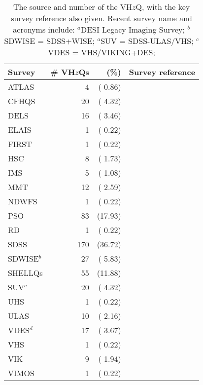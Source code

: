 \documentclass[usenatbib]{mnras}
\begin{document}
\begin{table}
\begin{tabular}{l r r l}
\hline  \hline
Survey              & \# VH$z$Qs & (\%) & Survey reference  \\
\hline  
  ATLAS             &     4    &   ( 0.86)    &  \citet{Shanks2015} \\
  CFHQS            &   20    &   ( 4.32)    &  \citet{Willott2007} \\
  DELS               &   16    &   ( 3.46)    &  \citet{Dey2018} \\
  ELAIS              &     1    &   ( 0.22)    &  \citet{Vaisanen2000} \\
  FIRST              &     1    &   ( 0.22)    &  \citet{Becker1995} \\
  HSC                 &    8    &   ( 1.73)    & \citet{Miyazaki2018} \\
  IMS                 &     5    &   ( 1.08)     &  \citet{Kim2015} \\
  MMT               &   12    &   ( 2.59)     &  \citet{McGreer2013} \\
  NDWFS           &     1    &   ( 0.22)    &  \citet{JD1999} \\
  PSO                 &   83   &   (17.93)   &   \citet{Kaiser2002, Kaiser2010} \\
  RD                   &     1   &   ( 0.22)    &  \citet{Mahabal2005} \\
  SDSS                &  170  &    (36.72)    & \citet{EDR} \\
 SDWISE$^{b}$    &   27    &  ( 5.83)    &   \citet{WangF2016} \\
  SHELLQs         &    55    &   (11.88)  &  \citet{Matsuoka2016}     \\  
  SUV$^{c}$       &   20     &    ( 4.32)  & \citet{YangJ2017} \\
  UHS               &    1      &  ( 0.22)     &  \citet{WangF2017} \\
  ULAS               &   10   &   ( 2.16)     & \citet{Lawrence2007} \\
  VDES$^{d}$       &   17  &    ( 3.67)     &  \citet{Reed2017} \\
  VHS                 &     1  &     ( 0.22)    & \citet{WangF2018b} \\
  VIK                 &     9    &  ( 1.94)    &  \citet{Edge2013} \\
  VIMOS           &    1      &  ( 0.22)     &   \citet{LeFevre2003} \\
\hline  \hline
\end{tabular}
\caption{The source and number of the VH$z$Q, with the key survey reference also given. 
  Recent survey name and acronyms include: 
  $^{a}$DESI Legacy Imaging Survey; 
  $^{b}$SDWISE = SDSS+WISE; 
  $^{a}$SUV  = SDSS-ULAS/VHS; 
  $^{c}$VDES = VHS/VIKING+DES; 
}
      \label{tab:surveys}
\end{table}
\end{document}
